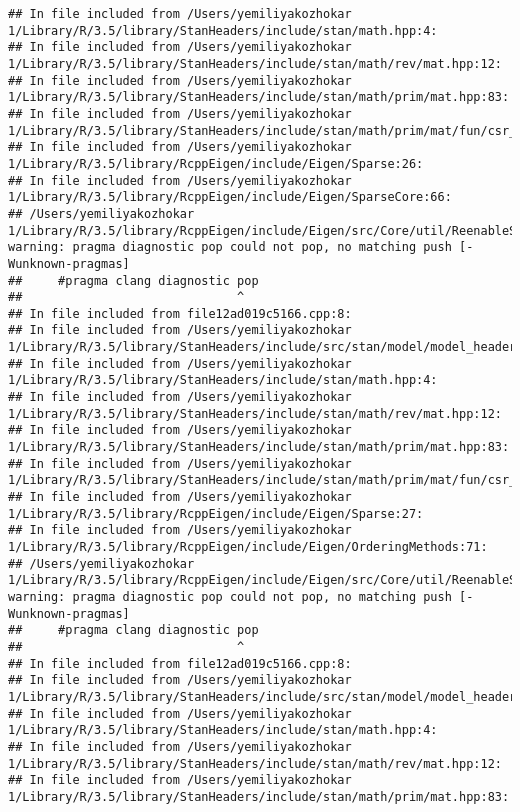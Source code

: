\documentclass[]{article}
\begin{document}
\begin{verbatim}
## In file included from /Users/yemiliyakozhokar 1/Library/R/3.5/library/StanHeaders/include/stan/math.hpp:4:
## In file included from /Users/yemiliyakozhokar 1/Library/R/3.5/library/StanHeaders/include/stan/math/rev/mat.hpp:12:
## In file included from /Users/yemiliyakozhokar 1/Library/R/3.5/library/StanHeaders/include/stan/math/prim/mat.hpp:83:
## In file included from /Users/yemiliyakozhokar 1/Library/R/3.5/library/StanHeaders/include/stan/math/prim/mat/fun/csr_extract_u.hpp:6:
## In file included from /Users/yemiliyakozhokar 1/Library/R/3.5/library/RcppEigen/include/Eigen/Sparse:26:
## In file included from /Users/yemiliyakozhokar 1/Library/R/3.5/library/RcppEigen/include/Eigen/SparseCore:66:
## /Users/yemiliyakozhokar 1/Library/R/3.5/library/RcppEigen/include/Eigen/src/Core/util/ReenableStupidWarnings.h:10:30: warning: pragma diagnostic pop could not pop, no matching push [-Wunknown-pragmas]
##     #pragma clang diagnostic pop
##                              ^
## In file included from file12ad019c5166.cpp:8:
## In file included from /Users/yemiliyakozhokar 1/Library/R/3.5/library/StanHeaders/include/src/stan/model/model_header.hpp:4:
## In file included from /Users/yemiliyakozhokar 1/Library/R/3.5/library/StanHeaders/include/stan/math.hpp:4:
## In file included from /Users/yemiliyakozhokar 1/Library/R/3.5/library/StanHeaders/include/stan/math/rev/mat.hpp:12:
## In file included from /Users/yemiliyakozhokar 1/Library/R/3.5/library/StanHeaders/include/stan/math/prim/mat.hpp:83:
## In file included from /Users/yemiliyakozhokar 1/Library/R/3.5/library/StanHeaders/include/stan/math/prim/mat/fun/csr_extract_u.hpp:6:
## In file included from /Users/yemiliyakozhokar 1/Library/R/3.5/library/RcppEigen/include/Eigen/Sparse:27:
## In file included from /Users/yemiliyakozhokar 1/Library/R/3.5/library/RcppEigen/include/Eigen/OrderingMethods:71:
## /Users/yemiliyakozhokar 1/Library/R/3.5/library/RcppEigen/include/Eigen/src/Core/util/ReenableStupidWarnings.h:10:30: warning: pragma diagnostic pop could not pop, no matching push [-Wunknown-pragmas]
##     #pragma clang diagnostic pop
##                              ^
## In file included from file12ad019c5166.cpp:8:
## In file included from /Users/yemiliyakozhokar 1/Library/R/3.5/library/StanHeaders/include/src/stan/model/model_header.hpp:4:
## In file included from /Users/yemiliyakozhokar 1/Library/R/3.5/library/StanHeaders/include/stan/math.hpp:4:
## In file included from /Users/yemiliyakozhokar 1/Library/R/3.5/library/StanHeaders/include/stan/math/rev/mat.hpp:12:
## In file included from /Users/yemiliyakozhokar 1/Library/R/3.5/library/StanHeaders/include/stan/math/prim/mat.hpp:83:

\end{verbatim}
\end{document}
